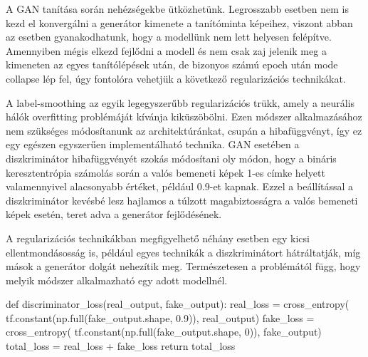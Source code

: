 A GAN tanítása során nehézségekbe ütközhetünk. Legrosszabb esetben nem is kezd el konvergálni a generátor kimenete a tanítóminta képeihez, viszont abban az esetben gyanakodhatunk, hogy a modellünk nem lett helyesen felépítve. Amennyiben mégis elkezd fejlődni a modell és nem csak zaj jelenik meg a kimeneten az egyes tanítólépések után, de bizonyos számú epoch után mode collapse lép fel, úgy fontolóra vehetjük a következő regularizációs technikákat.

A label-smoothing az egyik legegyszerűbb regularizációs trükk, amely a neurális hálók overfitting problémáját kívánja kiküszöbölni. Ezen módszer alkalmazásához nem szükséges módosítanunk az architektúránkat, csupán a hibafüggvényt, így ez egy egészen egyszerűen implementálható technika. GAN esetében a diszkriminátor hibafüggvényét szokás módosítani oly módon, hogy a bináris keresztentrópia számolás során a valós bemeneti képek 1-es címke helyett valamennyivel alacsonyabb értéket, például 0.9-et kapnak. Ezzel a beállítással a diszkriminátor kevésbé lesz hajlamos a túlzott magabiztosságra a valós bemeneti képek esetén, teret adva a generátor fejlődésének.

A regularizációs technikákban megfigyelhető néhány esetben egy kicsi ellentmondásosság is, például egyes technikák a diszkriminátort hátráltatják, míg mások a generátor dolgát nehezítik meg. Természetesen a problémától függ, hogy melyik módszer alkalmazható egy adott modellnél.

\begin{python}
def discriminator_loss(real_output, fake_output):
    real_loss = cross_entropy(
	    tf.constant(np.full(fake_output.shape, 0.9)),
	    real_output)
    fake_loss = cross_entropy(
	    tf.constant(np.full(fake_output.shape, 0)),
	    fake_output)
    total_loss = real_loss + fake_loss
    return total_loss
\end{python}


